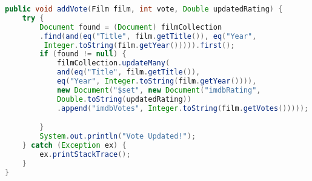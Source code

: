 \begin{lstlisting}[language=Java,  basicstyle=\footnotesize]
public void addVote(Film film, int vote, Double updatedRating) {
	try {
		Document found = (Document) filmCollection
		.find(and(eq("Title", film.getTitle()), eq("Year",
		 Integer.toString(film.getYear())))).first();
		if (found != null) {
			filmCollection.updateMany(
			and(eq("Title", film.getTitle()), 
			eq("Year", Integer.toString(film.getYear()))),
			new Document("$set", new Document("imdbRating",
			Double.toString(updatedRating))
			.append("imdbVotes", Integer.toString(film.getVotes()))));

		}
		System.out.println("Vote Updated!");
	} catch (Exception ex) {
		ex.printStackTrace();
	}
}
\end{lstlisting}